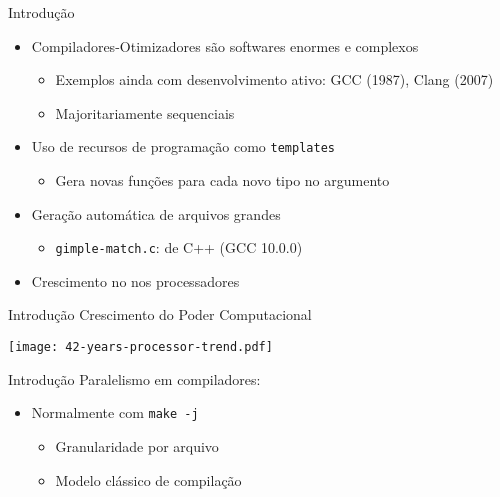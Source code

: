 \begin{frame}{Introdução}
  \begin{itemize}
    \item Compiladores-Otimizadores são softwares enormes e complexos
        \begin{itemize}
            \item Exemplos ainda com desenvolvimento ativo: GCC (1987), Clang (2007)
            \item Majoritariamente sequenciais
        \end{itemize}
    \item Uso de recursos de programação como \texttt{templates}
        \begin{itemize}
           \item Gera novas funções para cada novo tipo no argumento
        \end{itemize}
    \item Geração automática de arquivos grandes
        \begin{itemize}
            \item \texttt{gimple-match.c}: {\color{red}{100358 linhas}} de C++ (GCC 10.0.0)
        \end{itemize}
    \item Crescimento {\color{red}{exponencial}} no {\color{blue}{número de núcleos}} nos processadores
  \end{itemize}
\end{frame}

\begin{frame}{Introdução}
    Crescimento do Poder Computacional \citep{42years}

    \centering
    \texttt{[image: 42-years-processor-trend.pdf]}
    \label{fig:42years}
\end{frame}

\begin{frame}{Introdução}
    Paralelismo em compiladores:
    \begin{itemize}
        \item Normalmente com \texttt{make -j}
            \begin{itemize}
                \item Granularidade por arquivo
                \item Modelo clássico de compilação
            \end{itemize}
    \end{itemize}
\end{frame}

